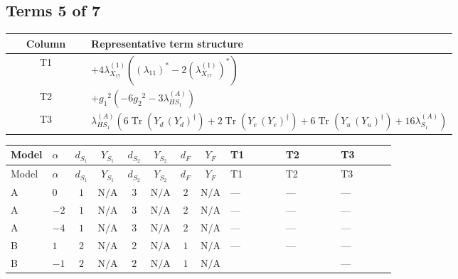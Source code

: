 \documentclass[8pt]{article}
\begin{document}
\begin{landscape}
\subsection*{Terms 5 of 7}
\begin{center}
\begin{tabular}{@{}c >{\raggedright\arraybackslash}p{0.82\linewidth}@{}}
\toprule
Column & Representative term structure \\
\midrule
T1 & \(\displaystyle +4 {\lambda_{X_{17}}^{(1)}} (\left({\lambda_{11}}\right)^{*}-2 \left({\lambda_{X_{17}}^{(1)}}\right)^{*})\) \\
\midrule
T2 & \(\displaystyle +{g_1}^2 \left(-6 {g_2}^2-3 {\lambda_{HS_1}^{(A)}}\right)\) \\
\midrule
T3 & \(\displaystyle {\lambda_{HS_1}^{(A)}} (6 \operatorname{Tr}\!\left({Y_d}\,\left({Y_d}\right)^{\dagger}\right)+2 \operatorname{Tr}\!\left({Y_e}\,\left({Y_e}\right)^{\dagger}\right)+6 \operatorname{Tr}\!\left({Y_u}\,\left({Y_u}\right)^{\dagger}\right)+16 {\lambda_{S_1}^{(A)}})\) \\
\midrule
\bottomrule
\end{tabular}
\end{center}
\smallskip
\tiny
\begin{longtable}{@{}llcccccc >{\raggedright\arraybackslash}p{0.21\linewidth} >{\raggedright\arraybackslash}p{0.21\linewidth} >{\raggedright\arraybackslash}p{0.21\linewidth}@{}}
\toprule
Model & $\alpha$ & $d_{S_1}$ & $Y_{S_1}$ & $d_{S_2}$ & $Y_{S_2}$ & $d_F$ & $Y_F$ & T1 & T2 & T3 \\
\midrule
\endfirsthead
\toprule
Model & $\alpha$ & $d_{S_1}$ & $Y_{S_1}$ & $d_{S_2}$ & $Y_{S_2}$ & $d_F$ & $Y_F$ & T1 & T2 & T3 \\
\midrule
\endhead
A & $0$ & $1$ & $\text{N/A}$ & $3$ & $\text{N/A}$ & $2$ & $\text{N/A}$ & --- & --- & --- \\
\midrule
A & $-2$ & $1$ & $\text{N/A}$ & $3$ & $\text{N/A}$ & $2$ & $\text{N/A}$ & --- & --- & --- \\
\midrule
A & $-4$ & $1$ & $\text{N/A}$ & $3$ & $\text{N/A}$ & $2$ & $\text{N/A}$ & --- & --- & --- \\
\midrule
B & $1$ & $2$ & $\text{N/A}$ & $2$ & $\text{N/A}$ & $1$ & $\text{N/A}$ & --- & --- & --- \\
\midrule
B & $-1$ & $2$ & $\text{N/A}$ & $2$ & $\text{N/A}$ & $1$ & $\text{N/A}$ & \scriptsize\adjustbox{max width=\linewidth}{$\begin{gathered} +4 {\lambda_{X_{17}}^{(1)}} (\left({\lambda_{11}}\right)^{*}-2 \left({\lambda_{X_{17}}^{(1)}}\right)^{*})\end{gathered}$} & \scriptsize\adjustbox{max width=\linewidth}{$\begin{gathered} +{g_1}^2 \left(-6 {g_2}^2-3 {\lambda_{HS_1}^{(A)}}\right)\end{gathered}$} & --- \\

\end{longtable}
\end{landscape}
\end{document}
